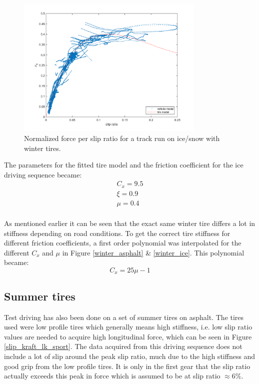 \begin{figure}[h]
	\centering
	\includegraphics[width=0.8\textwidth]{Pictures/slip_kraft_is}
	\caption {Normalized force per slip ratio for a track run on ice/snow with winter tires.}
	\label{slip_kraft_is}
\end{figure}

The parameters for the fitted tire model and the friction coefficient for the ice driving sequence became:
\begin{equation}
\label{winter_ice}
\begin{split}
C_{x} = 9.5 \\
\xi = 0.9 \\
\mu = 0.4 \\
\end{split}
\end{equation}

As mentioned earlier it can be seen that the exact same winter tire differs a lot in stiffness depending on road conditions. To get the correct tire stiffness for different friction coefficients, a first order polynomial was interpolated for the different $ C_{x} $ and $ \mu $ in Figure \ref{winter_asphalt} \& \ref{winter_ice}. This polynomial became:
\begin{equation}
	C_{x} = 25\mu - 1
\end{equation}

\subsection{Summer tires}
\label{summer_tire}
Test driving has also been done on a set of summer tires on asphalt. The tires used were low profile tires which generally means high stiffness, i.e. low slip ratio values are needed to acquire high longitudinal force, which can be seen in Figure \ref{slip_kraft_lk_sport}. The data acquired from this driving sequence does not include a lot of slip around the peak slip ratio, much due to the high stiffness and good grip from the low profile tires. It is only in the first gear that the slip ratio actually exceeds this peak in force which is assumed to be at slip ratio $ \approx 6 \% $.

